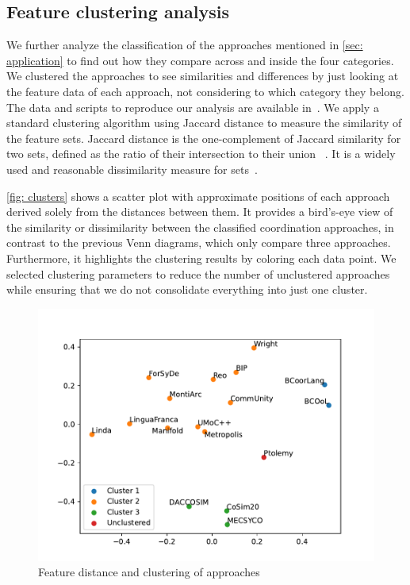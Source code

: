 \documentclass[runningheads]{llncs}
\begin{document}
\subsection{Feature clustering analysis}

We further analyze the classification of the approaches mentioned in \autoref{sec: application} to find out how they compare across and inside the four categories.
We clustered the approaches to see similarities and differences by just looking at the feature data of each approach, not considering to which category they belong.
The data and scripts to reproduce our analysis are available in~\cite{timkrauterArtifactsCoordination2024}.
We apply a standard clustering algorithm using Jaccard distance to measure the similarity of the feature sets.
Jaccard distance is the one-complement of Jaccard similarity for two sets, defined as the ratio of their intersection to their union ~\cite{levandowskyDistanceSets1971}.
It is a widely used and reasonable dissimilarity measure for sets~\cite{levandowskyDistanceSets1971}.

\autoref{fig: clusters} shows a scatter plot with approximate positions of each approach derived solely from the distances between them.
It provides a bird's-eye view of the similarity or dissimilarity between the classified coordination approaches, in contrast to the previous Venn diagrams, which only compare three approaches.
Furthermore, it highlights the clustering results by coloring each data point.
We selected clustering parameters to reduce the number of unclustered approaches while ensuring that we do not consolidate everything into just one cluster.

\begin{figure}[ht]
	\centering
	\includegraphics[width=1\textwidth]{images/approach_scatter}
	\caption{Feature distance and clustering of approaches}
	\label{fig: clusters}
\end{figure}
\end{document}
